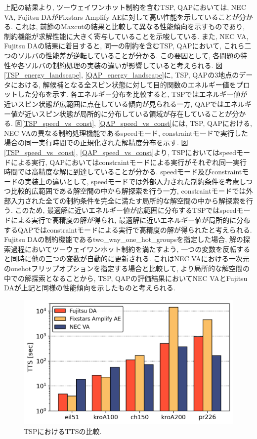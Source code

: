\documentclass[submit,techrep,noauthor]{ipsj}
\begin{document}
上記の結果より, ツーウェイワンホット制約を含むTSP, QAPにおいては, NEC VA, Fujitsu DAがFixstars Amplify AEに対して高い性能を示していることが分かる. これは, 前節のMaxcutの結果と比較して異なる性能傾向を示すものであり, 制約機能が求解性能に大きく寄与していることを示唆している. また, NEC VA, Fujitsu DAの結果に着目すると, 同一の制約を含むTSP, QAPにおいて, これら二つのソルバの性能差が逆転していることが分かる. この要因として, 各問題の特性や各ソルバの制約処理の実装の違いが影響していると考えられる. 図\ref{TSP_energy_landscape}, \ref{QAP_energy_landscape}に, TSP, QAPの3地点のデータにおける, 解候補となる全スピン状態に対して目的関数のエネルギー値をプロットした分布を示す. 各エネルギー分布を比較すると, TSPではエネルギー値が近いスピン状態が広範囲に点在している傾向が見られる一方, QAPではエネルギー値が近いスピン状態が局所的に分布している領域が存在していることが分かる. 図\ref{TSP_speed_vs_const}, \ref{QAP_speed_vs_const}には, TSP, QAPにおける, NEC VAの異なる制約処理機能であるspeedモード, constraintモードで実行した場合の同一実行時間での正規化された解精度分布を示す. 図\ref{TSP_speed_vs_const}, \ref{QAP_speed_vs_const}より, TSPにおいてはspeedモードによる実行, QAPにおいてはconstraintモードによる実行がそれぞれ同一実行時間では高精度な解に到達していることが分かる. speedモード及びconstraintモードの実装上の違いとして, speedモードでは外部入力された制約条件を考慮しつつ比較的広範囲である解空間の中から解探索を行う一方, constraintモードでは外部入力された全ての制約条件を完全に満たす局所的な解空間の中から解探索を行う. このため, 最適解に近いエネルギー値が広範囲に分布するTSPではspeedモードによる実行で高精度の解が得られ, 最適解に近いエネルギー値が局所的に分布するQAPではconstraintモードによる実行で高精度の解が得られたと考えられる. Fujitsu DAの制約機能であるtwo\_way\_one\_hot\_groupsを指定した場合, 解の探索過程においてツーウェイワンホット制約を満たすよう, 一つの変数を反転すると同時に他の三つの変数が自動的に更新される. これはNEC VAにおける一次元のonehotフリップオプションを指定する場合と比較して, より局所的な解空間の中での解探索となることから, TSP, QAPの評価結果においてNEC VAとFujitsu DAが上記と同様の性能傾向を示したものと考えられる.

\begin{figure}[hb]
\centering
\includegraphics[bb=0 0 700 250, width=15cm]{TTS_TSP.png}
\caption{TSPにおけるTTSの比較.}
\label{TSP_TTS}
\end{figure}
\end{document}
